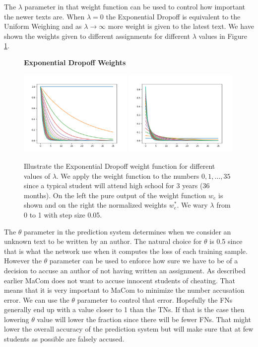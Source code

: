 The $\lambda$ parameter in that weight function can be used to control how
important the newer texts are. When $\lambda = 0$ the Exponential Dropoff is
equivalent to the Uniform Weighing and as $\lambda \rightarrow \infty$ more
weight is given to the latest text. We have shown the weights given to different
assignments for different $\lambda$ values in Figure \ref{fig:weights}.

\begin{figure}
    \centering
    \textbf{Exponential Dropoff Weights}\par\medskip
    \includegraphics[width=0.49\textwidth]{./pictures/method/weights.png}
    \includegraphics[width=0.49\textwidth]{./pictures/method/weights_normalized.png}
    \caption{Illustrate the Exponential Dropoff weight function for different
        values of $\lambda$. We apply the weight function to the numbers $0, 1,
        \dots, 35$ since a typical student will attend high school for 3 years
        (36 months). On the left the pure output of the weight function $w_e$ is
        shown and on the right the normalized weights $w_e^*$. We wary $\lambda$
        from 0 to 1 with step size 0.05.}
    \label{fig:weights}
\end{figure}


The $\theta$ parameter in the prediction system determines when we consider an
unknown text to be written by an author. The natural choice for $\theta$ is 0.5
since that is what the network use when it computes the loss of each training
sample. However the $\theta$ parameter can be used to enforce how sure we have
to be of a decision to accuse an author of not having written an assignment. As
described earlier MaCom does not want to accuse innocent students of cheating.
That means that it is very important to MaCom to minimize the number accusation
error. We can use the $\theta$ parameter to control that error. Hopefully the
\gls{FN}s generally end up with a value closer to 1 than the \gls{TN}s. If that
is the case then lowering $\theta$ value will lower the fraction since there
will be fewer \gls{FN}s. That might lower the overall accuracy of the prediction
system but will make sure that at few students as possible are falsely accused.
